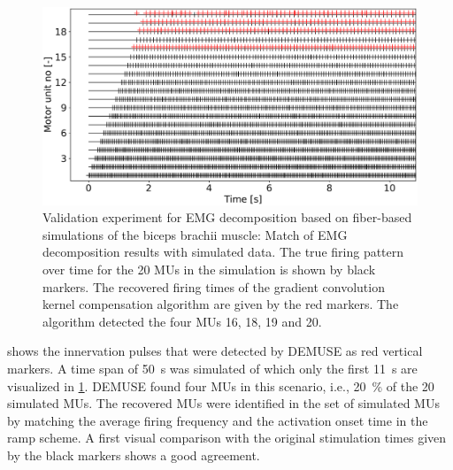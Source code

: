\begin{figure}
  \centering%
  \includegraphics[width=\textwidth]{images/results/application/emg_20mus-50s-old2.pdf}%
  \caption{Validation experiment for EMG decomposition based on fiber-based simulations of the biceps brachii muscle: Match of EMG decomposition results with simulated data. The true firing pattern over time for the 20 MUs in the simulation is shown by black markers. The recovered firing times of the gradient convolution kernel compensation algorithm are given by the red markers. The algorithm detected the four MUs 16, 18, 19 and 20.}%
  \label{fig:emg_20mus-50s-old2}%
\end{figure}

 shows the innervation pulses that were detected by DEMUSE as red vertical markers. A time span of \SI{50}{\s} was simulated of which only the first \SI{11}{\s} are visualized in \cref{fig:emg_20mus-50s-old2}. DEMUSE found four MUs in this scenario, i.e., \SI{20}{\percent} of the 20 simulated MUs. 
The recovered MUs were identified in the set of simulated MUs by matching the  average firing frequency and the activation onset time in the ramp scheme. A first visual comparison with the original stimulation times given by the black markers shows a good agreement.

